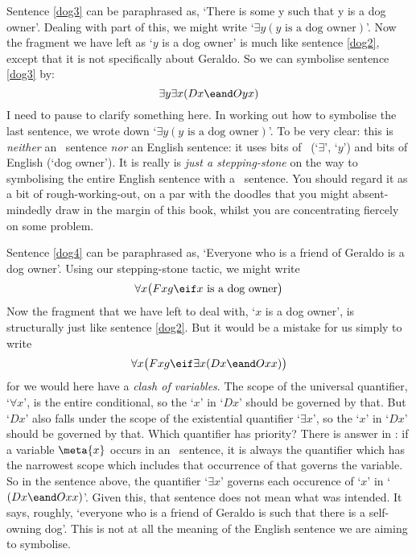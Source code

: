 Sentence \ref{dog3} can be paraphrased as, `There is some y such that y is a dog owner'. Dealing with part of this, we might write `$\exists y(y\text{ is a dog owner})$'. Now the fragment we have left as `$y$ is a dog owner' is much like sentence \ref{dog2}, except that it is not specifically about Geraldo. So we can symbolise sentence \ref{dog3} by:
$$\exists y \exists x(Dx \eand Oyx)$$
I need to pause to clarify something here. In working out how to symbolise the last sentence, we wrote down `$\exists y(y\text{ is a dog owner})$'. To be very clear: this is \emph{neither} an \FOL\ sentence \emph{nor} an English sentence: it uses bits of \FOL\ (`$\exists$', `$y$') and bits of English (`dog owner'). It is really is \emph{just a stepping-stone} on the way to symbolising the entire English sentence with a \FOL\ sentence. You should regard it as a bit of rough-working-out, on a par with the doodles that you might absent-mindedly draw in the margin of this book, whilst you are concentrating fiercely on some problem.  

Sentence \ref{dog4} can be paraphrased as, `Everyone who is a friend of Geraldo is a dog owner'. Using our stepping-stone tactic, we might write 
$$\forall x \bigl(Fxg \eif x \text{ is a dog owner}\bigr)$$
Now the fragment that we have left to deal with, `$x$ is a dog owner', is structurally just like sentence \ref{dog2}. But it would be a mistake for us simply to write 
$$\forall x \bigl(Fxg \eif \exists x(Dx \eand Oxx) \bigr)$$
for we would here have a \emph{clash of variables}. The scope of the universal quantifier, `$\forall x$', is the entire conditional, so the `$x$' in `$Dx$' should be governed by that. But `$Dx$' also falls under the scope of the existential quantifier `$\exists x$', so the `$x$' in `$Dx$' should be governed by that. Which quantifier has priority? There is answer in \FOL: if a variable $\meta{x}$ occurs in an \FOL\ sentence, it is always the quantifier which has the narrowest scope which includes that occurrence of  that governs the variable. So in the sentence above, the quantifier `$\exists x$' governs each occurence of `$x$' in `$(Dx \eand Oxx)$'. Given this, that sentence does not mean what was intended. It says, roughly, `everyone who is a friend of Geraldo is such that there is a self-owning dog'. This is not at all the meaning of the English sentence we are aiming to symbolise.



